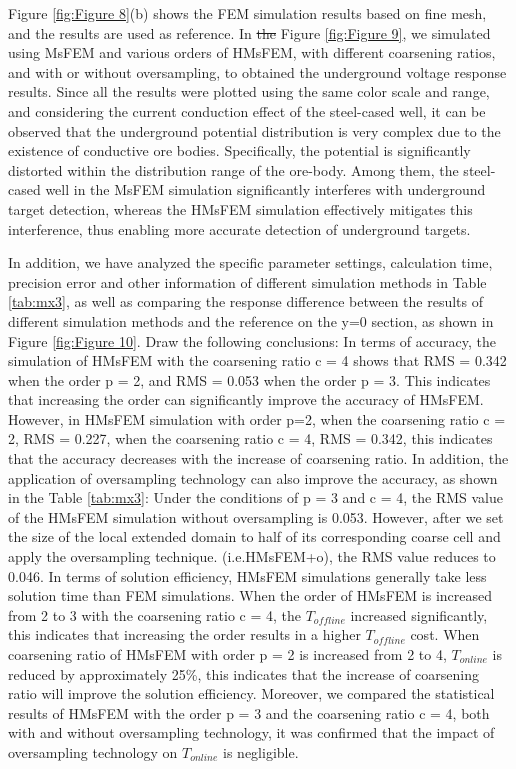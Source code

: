 \documentclass[manuscript,blind]{geophysics}
\providecommand{\DIFadd}[1]{{\protect\color{blue}\uwave{#1}}} %
\providecommand{\DIFdel}[1]{{\protect\color{red}\sout{#1}}}                      %
\providecommand{\DIFaddbegin}{} %
\providecommand{\DIFaddend}{} %
\providecommand{\DIFdelbegin}{} %
\providecommand{\DIFdelend}{} %
\newcommand{\DIFscaledelfig}{0.5}
\newlength{\DIFdelgraphicswidth} %
\newlength{\DIFdelgraphicsheight} %
\newcommand{\DIFaddincludegraphics}[2][]{{\color{blue}\fbox{\DIFOincludegraphics[#1]{#2}}}} %
\newcommand{\DIFdelincludegraphics}[2][]{%
\sbox{\DIFdelgraphicsbox}{\DIFOincludegraphics[#1]{#2}}%
\settoboxwidth{\DIFdelgraphicswidth}{\DIFdelgraphicsbox} %
\settoboxtotalheight{\DIFdelgraphicsheight}{\DIFdelgraphicsbox} %
\scalebox{\DIFscaledelfig}{%
\parbox[b]{\DIFdelgraphicswidth}{\usebox{\DIFdelgraphicsbox}\\[-\baselineskip] \rule{\DIFdelgraphicswidth}{0em}}\llap{\resizebox{\DIFdelgraphicswidth}{\DIFdelgraphicsheight}{%
\setlength{\unitlength}{\DIFdelgraphicswidth}%
\begin{picture}(1,1)%
\thicklines\linethickness{2pt} %
{\color[rgb]{1,0,0}\put(0,0){\framebox(1,1){}}}%
{\color[rgb]{1,0,0}\put(0,0){\line( 1,1){1}}}%
{\color[rgb]{1,0,0}\put(0,1){\line(1,-1){1}}}%
\end{picture}%
}\hspace*{3pt}}} %
} %
\DeclareRobustCommand{\DIFaddbegin}{\DIFOaddbegin \let\includegraphics\DIFaddincludegraphics} %
\DeclareRobustCommand{\DIFaddend}{\DIFOaddend \let\includegraphics\DIFOincludegraphics} %
\DeclareRobustCommand{\DIFdelbegin}{\DIFOdelbegin \let\includegraphics\DIFdelincludegraphics} %
\DeclareRobustCommand{\DIFdelend}{\DIFOaddend \let\includegraphics\DIFOincludegraphics} %
\begin{document}
Figure \ref{fig:Figure 8}(b) shows the FEM simulation results based on fine mesh, and the results are used as reference. In \DIFdelbegin \DIFdel{the }\DIFdelend Figure \ref{fig:Figure 9}, we simulated using MsFEM and various orders of HMsFEM, with different coarsening ratios, and with or without oversampling, to obtained the underground voltage response results. Since all the results were plotted using the same color scale and range, and considering the current conduction effect of the steel-cased well, it can be observed that the underground potential distribution is very complex due to the existence of conductive ore bodies. Specifically, the potential is significantly distorted within the distribution range of the ore-body. Among them, the steel-cased well in the MsFEM simulation significantly interferes with underground target detection, whereas the HMsFEM simulation effectively mitigates this interference, thus enabling more accurate detection of underground targets.

In addition, we have analyzed the specific parameter settings, calculation time, precision error and other information of different simulation methods in Table \ref{tab:mx3}, as well as comparing the response difference between the results of different simulation methods and the reference on the y=0 section, as shown in Figure \ref{fig:Figure 10}. Draw the following conclusions: In terms of accuracy, the simulation of HMsFEM with the coarsening ratio c = 4 shows that RMS = 0.342 when the order p = 2, and RMS = 0.053 when the order p = 3. This indicates that increasing the order can significantly improve the accuracy of HMsFEM. However, in HMsFEM simulation with order p=2, when the coarsening ratio c = 2, RMS = 0.227, when the coarsening ratio c = 4, RMS = 0.342, this indicates that the accuracy decreases with the increase of coarsening ratio. In addition, the application of oversampling technology can also improve the accuracy, as shown in the Table \ref{tab:mx3}: Under the conditions of p = 3 and c = 4, the RMS value of the HMsFEM simulation without oversampling is 0.053. However, after we set the size of the local extended domain to half of its corresponding coarse cell and apply the oversampling technique. (i.e.HMsFEM+o), the RMS value reduces to 0.046. In terms of solution efficiency, HMsFEM simulations generally take less solution time than FEM simulations. When the order of HMsFEM is increased from 2 to 3 with the coarsening ratio c = 4, the ${T_{offline}}$ increased significantly, this indicates that increasing the order results in a higher ${ T_{offline}}$ cost. When coarsening ratio of HMsFEM with order p = 2 is increased from 2 to 4, ${T_{online}}$ is reduced by approximately 25\%, this indicates that the increase of coarsening ratio will improve the solution efficiency. Moreover, we compared the statistical results of HMsFEM with the order p = 3 and the coarsening ratio c = 4, both with and without oversampling technology, it was confirmed that the impact of oversampling technology on ${T_{online}}$ is negligible. \DIFaddbegin \DIFadd{However, the impact on ${T_{offline}}$ is not negligible.
}\DIFaddend 
\end{document}
